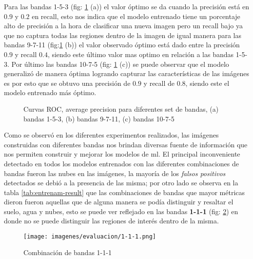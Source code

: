 Para las bandas 1-5-3 (fig: \ref{fig:Average_precision} (a)) el valor óptimo se da cuando la precisión está en $0.9$ y $0.2$ en recall, esto nos indica que el modelo entrenado tiene un porcentaje alto de precisión a la hora de clasificar una nueva imagen pero un recall bajo ya que no captura todas las regiones dentro de la imagen de igual manera para las bandas 9-7-11 (fig:\ref{fig:Average_precision} (b)) el valor observado óptimo está dado entre la precisión $0.9$ y recall $0.4$, siendo este último valor mas optimo en relación a las bandas 1-5-3. Por último las bandas 10-7-5 (fig: \ref{fig:Average_precision} (c)) se puede observar que el modelo generalizó de manera óptima logrando capturar las características de las imágenes es por esto que se obtuvo una precisión de $0.9$ y recall  de $0.8$, siendo este el modelo entrenado más óptimo. 

\begin{figure}[htbp]
\centering
{}
\caption{Curvas ROC, average precision para diferentes set de bandas, (a) bandas 1-5-3, (b) bandas 9-7-11, (c) bandas 10-7-5} \label{fig:Average_precision}
\end{figure}
 
Como se observó en los diferentes experimentos realizados, las imágenes construidas con diferentes bandas nos brindan diversas fuente de información que nos permiten construir y mejorar los modelos de \ac{ml}. El principal inconveniente detectado en todos los modelos entrenados con las diferentes combinaciones de bandas fueron las nubes en las imágenes, la mayoría de los \textit{falsos positivos} detectados se debió a la presencia de las misma; por otro lado se observa en la tabla \ref{tab:entrenam-result} que las combinaciones de bandas que mayor métricas dieron fueron aquellas que de alguna manera se podía distinguir y resaltar el suelo, agua y nubes, esto se puede ver reflejado en las bandas  \textbf{1-1-1} (fig: \ref{Fig:imagen_banda_111}) en donde no se puede distinguir las regiones de interés dentro de la misma. 
 
 \begin{figure}[H]\centering
  \texttt{[image: imagenes/evaluacion/1-1-1.png]}
  \caption{Combinación de bandas 1-1-1} \label{Fig:imagen_banda_111}
\end{figure}
 
